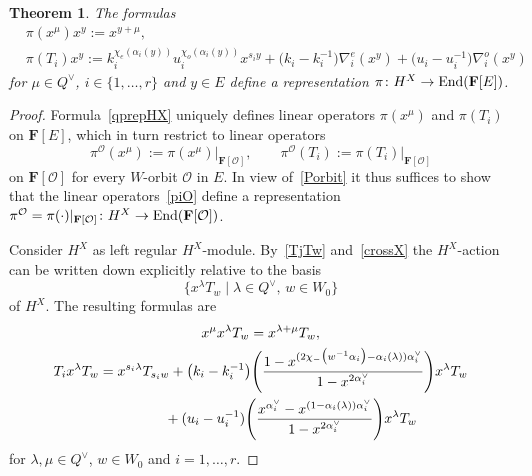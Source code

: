 \documentclass[11pt]{article}
\numberwithin{equation}{section}
\numberwithin{equation}{section}
\newtheorem{Theorem}{Theorem}[section]
\begin{document}
\begin{Theorem}\label{theoremH}
The formulas
\begin{align}
&\pi(x^\mu)x^y:=x^{y+\mu},\nonumber\\
&\pi(T_i)x^y:=k_i^{\chi_e(\alpha_i(y))}u_i^{\chi_o(\alpha_i(y))}x^{s_iy}+\bigl(k_i-k_i^{-1}\bigr)\nabla_i^e(x^y)+\bigl(u_i-u_i^{-1}\bigr)\nabla_i^o(x^y)\label{qprepHX}
\end{align}
for $\mu\in Q^\vee$, $i\in\{1,\dots,r\}$ and $y\in E$
define a representation $\pi\colon H^X\rightarrow\textup{End}(\mathbf{F}[E])$.
\end{Theorem}
\begin{proof}
Formula~\eqref{qprepHX} uniquely defines linear operators $\pi(x^\mu)$ and $\pi(T_i)$ on $\mathbf{F}[E]$, which in turn restrict to linear operators
\begin{equation}\label{piO}
\pi^{\mathcal{O}}(x^\mu):=\pi(x^\mu)\vert_{\mathbf{F}[\mathcal{O}]},\qquad \pi^{\mathcal{O}}(T_i):=\pi(T_i)\vert_{\mathbf{F}[\mathcal{O}]}
\end{equation}
on $\mathbf{F}[\mathcal{O}]$ for every $W$-orbit $\mathcal{O}$ in $E$. In view of~\eqref{Porbit} it thus suffices to show that the linear operators~\eqref{piO} define a representation $\pi^{\mathcal{O}}=\pi(\cdot)\vert_{\mathbf{F}[\mathcal{O}]}\colon H^X\rightarrow\textup{End}(\mathbf{F}[\mathcal{O}])$.

Consider $H^X$ as left regular $H^X$-module. By~\eqref{TjTw} and~\eqref{crossX} the $H^X$-action can be written down explicitly relative to the basis
\[
\bigl\{x^\lambda T_w\mid \lambda\in Q^\vee,\, w\in W_0\bigr\}
\]
of $H^X$. The resulting formulas are
\begin{gather}
x^\mu x^\lambda T_w=x^{\lambda+\mu}T_w,\nonumber\\
T_ix^\lambda T_w=x^{s_i\lambda}T_{s_iw}+\bigl(k_i-k_i^{-1}\bigr)\Biggl(\frac{1-x^{(2\chi_-\bigl(w^{-1}\alpha_i\bigr)-\alpha_i(\lambda))\alpha_i^\vee}}{1-x^{2\alpha_i^\vee}}\Biggr)x^\lambda T_w\nonumber\\
\hphantom{T_ix^\lambda T_w=}{}
+(u_i-u_i^{-1})\Biggl(\frac{x^{\alpha_i^\vee}-x^{(1-\alpha_i(\lambda))\alpha_i^\vee}}{1-x^{2\alpha_i^\vee}}\Biggr)x^{\lambda}T_w
\label{regularHX}
\end{gather}
for $\lambda,\mu\in Q^\vee$, $w\in W_0$ and $i=1,\dots,r$.


\end{proof}
\end{document}
